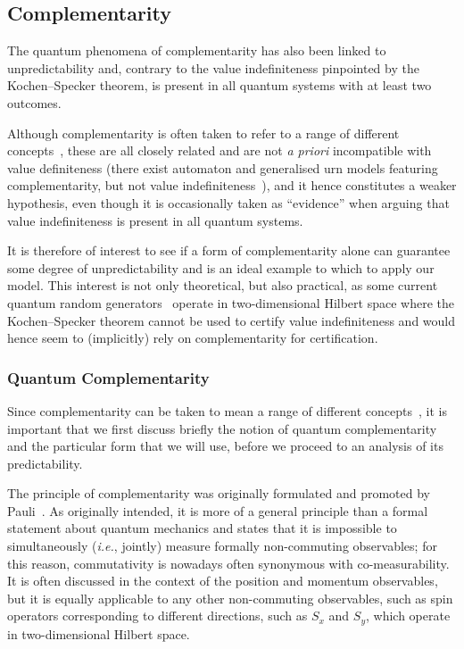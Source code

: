 \documentclass[information,article,accept,moreauthors,pdftex,12pt,a4paper]{mdpi}
\theoremstyle{mdpi}
\newcounter{ex}
\newcounter{re}
\theoremstyle{mdpidefinition}
\begin{document}
\subsection{Complementarity}


The quantum phenomena of complementarity has also been linked to unpredictability and, contrary to the value indefiniteness pinpointed by the Kochen--Specker theorem, is present in all quantum systems with at least two outcomes.

Although complementarity is often taken to refer to a range of different concepts~\cite{Fritz:2012fj}, these are all closely related and are
not \emph{a priori} incompatible with value definiteness (there exist automaton and generalised urn models featuring complementarity, but not value indefiniteness~\cite{wright,svozil-2001-eua}), and it hence constitutes a weaker hypothesis, even though it is occasionally taken as ``evidence'' when arguing that value indefiniteness is present in all quantum systems.

It is therefore of interest to see if a form of complementarity alone can guarantee some degree of unpredictability and is an ideal example to which to apply our model.
This interest is not only theoretical, but also practical, as some current quantum random generators~\cite{stefanov-2000} operate in two-dimensional Hilbert space where the Kochen--Specker theorem cannot be used to certify value indefiniteness and would hence seem to (implicitly) rely on complementarity for certification.

\subsubsection{Quantum Complementarity}

Since complementarity can be taken to mean a range of different concepts~\cite{Fritz:2012fj}, it is important that we first discuss briefly the notion of quantum complementarity and the particular form that we will use, before we proceed to an analysis of its predictability.

The principle of complementarity was originally formulated and promoted by Pauli~\cite{pauli:58}.
\linebreak As originally intended, it is more of a general principle than a formal statement about quantum mechanics and states that it is impossible to simultaneously (\emph{i.e.}, jointly) measure formally non-commuting observables; for this reason, commutativity is nowadays often synonymous with co-measurability.\linebreak
It is often discussed in the context of the position and momentum observables, but it is equally applicable to any other non-commuting observables, such as spin operators corresponding to different directions, such as $S_x$ and $S_y$, which operate in two-dimensional Hilbert space.
\end{document}
